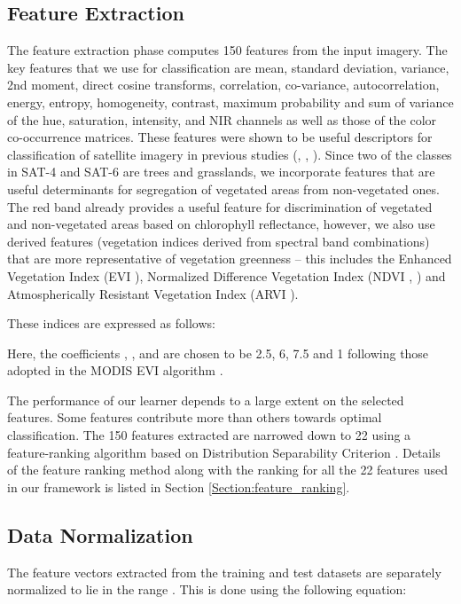 \documentclass[11pt,a4paper]{article}
\begin{document}
\subsection{Feature Extraction}
The feature extraction phase computes 150 features from the input imagery.  The key features that we use for classification are mean, standard deviation, variance, 2nd moment, direct cosine transforms, correlation, co-variance, autocorrelation, energy, entropy, homogeneity, contrast, maximum probability and sum of variance of the hue, saturation, intensity, and NIR channels as well as those of the color co-occurrence matrices. These features were shown to be useful descriptors for classification of satellite imagery in previous studies (\cite{haralick1973}, \cite{Soh99textureanalysis}, \cite{Clausi2002}). Since two of the classes in SAT-4 and SAT-6 are trees and grasslands, we incorporate features that are useful determinants for segregation of vegetated areas from non-vegetated ones. The red band already provides a useful feature for discrimination of vegetated and non-vegetated areas based on chlorophyll reflectance, however, we also use derived features (vegetation indices derived from spectral band combinations) that are more representative of vegetation greenness -- this includes the Enhanced Vegetation Index (EVI \cite{huete2002}), Normalized Difference Vegetation Index (NDVI \cite{rouse1974}, \cite{Tucker1979127}) and Atmospherically Resistant Vegetation Index (ARVI \cite{kaufman1992}).

These indices are expressed as follows:



Here, the coefficients , ,  and  are chosen to be 2.5, 6, 7.5 and 1 following those adopted in the MODIS EVI algorithm \cite{modis}.





The performance of our learner depends to a large extent on the selected features. Some features contribute more than others towards optimal classification. The 150 features extracted are narrowed down to 22 using a feature-ranking algorithm based on Distribution Separability Criterion \cite{Boureau10atheoretical}. Details of the feature ranking method along with the ranking for all the 22 features used in our framework is listed in Section \ref{Section:feature_ranking}. 

\subsection{Data Normalization}
The feature vectors extracted from the training and test datasets are separately normalized to lie in the range . This is done using the following equation:
\end{document}
